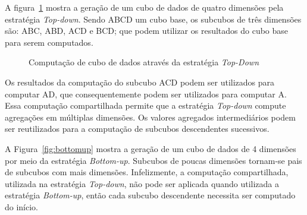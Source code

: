 A figura~\ref{fig:topdown} mostra a geração de um cubo de dados de quatro dimensões pela estratégia \textit{Top-down}.
Sendo ABCD um cubo base, os subcubos de três dimensões são: ABC, ABD, ACD e BCD; que podem utilizar os resultados do cubo base para serem computados.

\begin{figure}[!hbt]
	\caption{Computação de cubo de dados através da estratégia \textit{Top-Down}}\label{fig:topdown}
	\vspace{4mm}
	\begin{center}
	\end{center}
	\vspace{2mm}
	\legenda{}
\end{figure}

Os resultados da computação do subcubo ACD podem ser utilizados para computar AD, que consequentemente podem ser utilizados para computar A.
Essa computação compartilhada permite que a estratégia \textit{Top-down} compute agregações em múltiplas dimensões.
Os valores agregados intermediários podem ser reutilizados para a computação de subcubos descendentes sucessivos.

A Figura~\ref{fig:bottomup} mostra a geração de um cubo de dados de 4 dimensões por meio da estratégia \textit{Bottom-up}.
Subcubos de poucas dimensões tornam-se pais de subcubos com mais dimensões.
Infelizmente, a computação compartilhada, utilizada na estratégia \textit{Top-down}, não pode ser aplicada quando utilizada a estratégia \textit{Bottom-up}, então cada subcubo descendente necessita ser computado do início.

